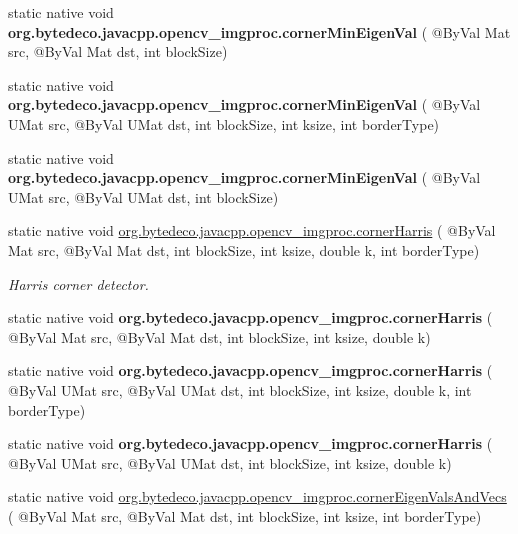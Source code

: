 \begin{DoxyCompactItemize}
static native void {\bfseries org.\+bytedeco.\+javacpp.\+opencv\+\_\+imgproc.\+corner\+Min\+Eigen\+Val} ( @By\+Val Mat src, @By\+Val Mat dst, int block\+Size)
\item 
\mbox{\label{group__imgproc__feature_ga6bcf83fd8a90939a6d0c56770bffd5cb}} 
static native void {\bfseries org.\+bytedeco.\+javacpp.\+opencv\+\_\+imgproc.\+corner\+Min\+Eigen\+Val} ( @By\+Val U\+Mat src, @By\+Val U\+Mat dst, int block\+Size, int ksize, int border\+Type)
\item 
\mbox{\label{group__imgproc__feature_ga1f6a5a4d16340bf0296a92b6f62b4fa6}} 
static native void {\bfseries org.\+bytedeco.\+javacpp.\+opencv\+\_\+imgproc.\+corner\+Min\+Eigen\+Val} ( @By\+Val U\+Mat src, @By\+Val U\+Mat dst, int block\+Size)
\item 
static native void \hyperlink{group__imgproc__feature_ga33bee1c8b89d7d1963fe5212170ab77b}{org.\+bytedeco.\+javacpp.\+opencv\+\_\+imgproc.\+corner\+Harris} ( @By\+Val Mat src, @By\+Val Mat dst, int block\+Size, int ksize, double k, int border\+Type)
\begin{DoxyCompactList}\small\item\em Harris corner detector. \end{DoxyCompactList}\item 
\mbox{\label{group__imgproc__feature_ga91ba396858c3ff82711b2f07a7fdec37}} 
static native void {\bfseries org.\+bytedeco.\+javacpp.\+opencv\+\_\+imgproc.\+corner\+Harris} ( @By\+Val Mat src, @By\+Val Mat dst, int block\+Size, int ksize, double k)
\item 
\mbox{\label{group__imgproc__feature_gae4b385be2c8566d92ab23a08e0623817}} 
static native void {\bfseries org.\+bytedeco.\+javacpp.\+opencv\+\_\+imgproc.\+corner\+Harris} ( @By\+Val U\+Mat src, @By\+Val U\+Mat dst, int block\+Size, int ksize, double k, int border\+Type)
\item 
\mbox{\label{group__imgproc__feature_ga47b99ed00eec5337b6fd08f3337017d5}} 
static native void {\bfseries org.\+bytedeco.\+javacpp.\+opencv\+\_\+imgproc.\+corner\+Harris} ( @By\+Val U\+Mat src, @By\+Val U\+Mat dst, int block\+Size, int ksize, double k)
\item 
static native void \hyperlink{group__imgproc__feature_gaf0aa40bf8a841f8e468c41bb2d2583b4}{org.\+bytedeco.\+javacpp.\+opencv\+\_\+imgproc.\+corner\+Eigen\+Vals\+And\+Vecs} ( @By\+Val Mat src, @By\+Val Mat dst, int block\+Size, int ksize, int border\+Type)

\end{DoxyCompactItemize}
